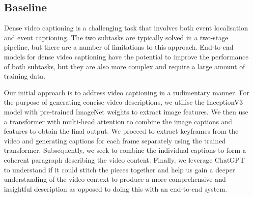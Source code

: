 \subsection{Baseline}
Dense video captioning is a challenging task that involves both event localisation and event captioning. The two subtasks are typically solved in a two-stage pipeline, but there are a number of limitations to this approach. End-to-end models for dense video captioning have the potential to improve the performance of both subtasks, but they are also more complex and require a large amount of training data. 

Our initial approach is to address video captioning in a rudimentary manner. For the purpose of generating concise video descriptions, we utilise the InceptionV3 \cite{Szegedy2015RethinkingTI} model with pre-trained ImageNet weights to extract image features. We then use a transformer with multi-head attention to combine the image captions and features to obtain the final output. We proceed to extract keyframes from the video and generating captions for each frame separately using the trained transformer. Subsequently, we seek to combine the individual captions to form a coherent paragraph describing the video content. Finally, we leverage ChatGPT to understand if it could stitch the pieces together and help us gain a deeper understanding of the video context to produce a more comprehensive and insightful description as opposed to doing this with an end-to-end system.

